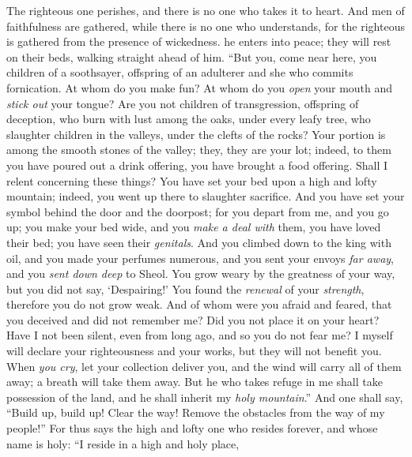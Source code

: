 \begin{biblechapter} %
 The righteous one perishes, and there is no one who takes it to heart. 
And men of faithfulness are gathered, while there is no one who understands, 
for the righteous is gathered from the presence of wickedness.
\verse he enters into peace; 
they will rest on their beds, 
walking straight ahead of him.
\verse “But you, come near here, you children of a soothsayer, 
offspring of an adulterer and she who commits fornication.
\verse At whom do you make fun? 
At whom do you \textit{open} your mouth and \textit{stick out} your tongue? 
Are you not children of transgression, 
offspring of deception,
\verse who burn with lust among the oaks, 
under every leafy tree, 
who slaughter children in the valleys, 
under the clefts of the rocks?
\verse Your portion is among the smooth stones of the valley; 
they, they are your lot; 
indeed, to them you have poured out a drink offering, 
you have brought a food offering. Shall I relent concerning these things?
\verse You have set your bed upon a high and lofty mountain; 
indeed, you went up there to slaughter sacrifice.
\verse And you have set your symbol behind the door and the doorpost; 
for you depart from me, and you go up; 
you make your bed wide, and you \textit{make a deal with} them, 
you have loved their bed; you have seen their \textit{genitals}.
\verse And you climbed down to the king with oil, 
and you made your perfumes numerous, 
and you sent your envoys \textit{far away}, 
and you \textit{sent down deep} to Sheol.
\verse You grow weary by the greatness of your way, 
but you did not say, ‘Despairing!’ 
You found the \textit{renewal} of your \textit{strength}, 
therefore you do not grow weak.
\verse And of whom were you afraid and feared, that you deceived 
and did not remember me? 
Did you not place it on your heart? 
Have I not been silent, even from long ago, 
and so you do not fear me?
\verse I myself will declare your righteousness and your works, 
but they will not benefit you.
\verse When \textit{you cry}, let your collection deliver you, 
and the wind will carry all of them away; 
a breath will take them away. 
But he who takes refuge in me shall take possession of the land, 
and he shall inherit my \textit{holy mountain}.”
 And one shall say, “Build up, build up! Clear the way! 
Remove the obstacles from the way of my people!”
\verse For thus says the high and lofty one who resides forever, and whose name is holy:
\verse “I reside in a high and holy place, 

\end{biblechapter}
